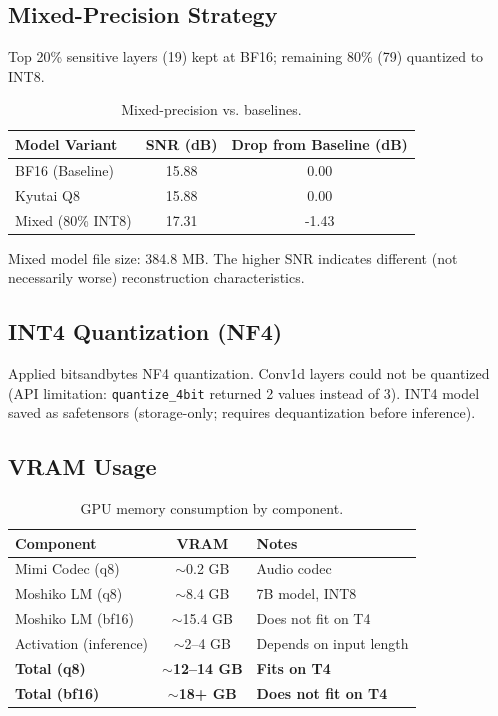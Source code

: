 \documentclass[11pt]{article}
\begin{document}
\subsection{Mixed-Precision Strategy}
Top 20\% sensitive layers (19) kept at BF16; remaining 80\% (79) quantized to INT8.

\begin{table}[H]
\centering
\caption{Mixed-precision vs. baselines.}
\label{tab:mixed_precision}
\begin{tabular}{@{}lcc@{}}
\toprule
\textbf{Model Variant} & \textbf{SNR (dB)} & \textbf{Drop from Baseline (dB)} \\
\midrule
BF16 (Baseline) & 15.88 & 0.00 \\
Kyutai Q8 & 15.88 & 0.00 \\
Mixed (80\% INT8) & 17.31 & -1.43 \\
\bottomrule
\end{tabular}
\end{table}

Mixed model file size: 384.8 MB. The higher SNR indicates different (not necessarily worse) reconstruction characteristics.

\subsection{INT4 Quantization (NF4)}
Applied bitsandbytes NF4 quantization. Conv1d layers could not be quantized (API limitation: \texttt{quantize\_4bit} returned 2 values instead of 3). INT4 model saved as safetensors (storage-only; requires dequantization before inference).

\subsection{VRAM Usage}
\begin{table}[H]
\centering
\caption{GPU memory consumption by component.}
\label{tab:vram}
\begin{tabular}{@{}lcl@{}}
\toprule
\textbf{Component} & \textbf{VRAM} & \textbf{Notes} \\
\midrule
Mimi Codec (q8) & $\sim$0.2 GB & Audio codec \\
Moshiko LM (q8) & $\sim$8.4 GB & 7B model, INT8 \\
Moshiko LM (bf16) & $\sim$15.4 GB & Does not fit on T4 \\
Activation (inference) & $\sim$2--4 GB & Depends on input length \\
\midrule
\textbf{Total (q8)} & \textbf{$\sim$12--14 GB} & \textbf{Fits on T4} \\
\textbf{Total (bf16)} & \textbf{$\sim$18+ GB} & \textbf{Does not fit on T4} \\
\bottomrule
\end{tabular}
\end{table}
\end{document}
